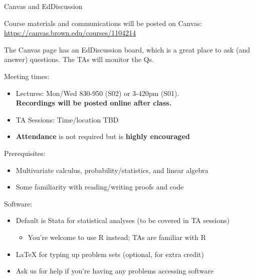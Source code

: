 \documentclass[11pt,english,handout]{beamer}
\begin{document}
\begin{frame}{Canvas and EdDiscussion}

Course materials and communications will be posted on Canvas: {\url{https://canvas.brown.edu/courses/1104214}} \bigskip 

The Canvas page has an EdDiscussion board, which is a great place to ask (and answer) questions. The TAs will monitor the Qs.

\end{frame}

\begin{frame}
\vspace{0.2cm}
Meeting times:

\begin{itemize}
\item Lectures: Mon/Wed 830-950 (S02) or 3-420pm (S01).\\ \textbf{Recordings will be posted online after class.}
\vspace{0.1cm}
\item TA Sessions: Time/location TBD


\vspace{0.1cm}
\item \textbf{Attendance} is not required but is \textbf{highly encouraged}
\end{itemize}
\vspace{0.3cm}

\pause{}

Prerequisites:

\begin{itemize}
\item Multivariate calculus, probability/statistics, and linear algebra
\vspace{0.1cm}
\item Some familiarity with reading/writing proofs and code
\end{itemize}
\vspace{0.2cm}

\pause{}

Software:

\begin{itemize}
\item Default is Stata for statistical analyses (to be covered in TA sessions)
	\begin{itemize}
		\item 
		You're welcome to use R instead; TAs are familiar with R
	\end{itemize}
\vspace{0.1cm}
\item LaTeX for typing up problem sets (optional, for extra credit)
\vspace{0.1cm}
\item Ask us for help if you're having any problems accessing software
\end{itemize}

\end{frame}
\end{document}
